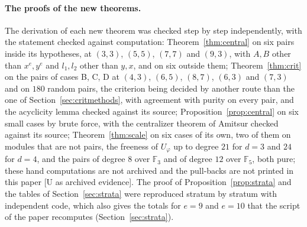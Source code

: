 \documentclass[11pt]{article}
\theoremstyle{definition}
\theoremstyle{remark}
\newcommand{\F}{\mathbb{F}}
\begin{document}
\paragraph{The proofs of the new theorems.} The derivation of each new theorem was checked step by step independently, with the statement checked against computation: Theorem~\ref{thm:central} on six pairs inside its hypotheses, at $(3,3)$, $(5,5)$, $(7,7)$ and $(9,3)$, with $A,B$ other than $x^e,y^e$ and $l_1,l_2$ other than $y,x$, and on six outside them; Theorem~\ref{thm:crit} on the pairs of cases B, C, D at $(4,3)$, $(6,5)$, $(8,7)$, $(6,3)$ and $(7,3)$ and on $180$ random pairs, the criterion being decided by another route than the one of Section~\ref{sec:critmethods}, with agreement with purity on every pair, and the acyclicity lemma checked against its source; Proposition~\ref{prop:central} on six small cases by brute force, with the centralizer theorem of Amitsur checked against its source; Theorem~\ref{thm:scale} on six cases of its own, two of them on modules that are not pairs, the freeness of $U_\varphi$ up to degree $21$ for $d=3$ and $24$ for $d=4$, and the pairs of degree $8$ over $\F_3$ and of degree $12$ over $\F_5$, both pure; these hand computations are not archived and the pull-backs are not printed in this paper [U as archived evidence]. The proof of Proposition~\ref{prop:strata} and the tables of Section~\ref{sec:strata} were reproduced stratum by stratum with independent code, which also gives the totals for $e=9$ and $e=10$ that the script of the paper recomputes (Section~\ref{sec:strata}).
\end{document}

